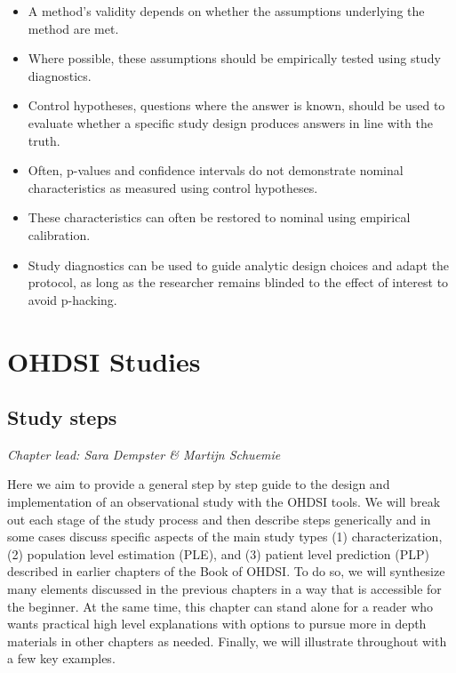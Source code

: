 \documentclass[11pt]{book}
\theoremstyle{definition}
\theoremstyle{definition}
\theoremstyle{definition}
\theoremstyle{remark}
\let\BeginKnitrBlock\begin \let\EndKnitrBlock\end
\begin{document}
\BeginKnitrBlock{rmdsummary}
\begin{itemize}
\item
  A method's validity depends on whether the assumptions underlying the method are met.
\item
  Where possible, these assumptions should be empirically tested using study diagnostics.
\item
  Control hypotheses, questions where the answer is known, should be used to evaluate whether a specific study design produces answers in line with the truth.
\item
  Often, p-values and confidence intervals do not demonstrate nominal characteristics as measured using control hypotheses.
\item
  These characteristics can often be restored to nominal using empirical calibration.
\item
  Study diagnostics can be used to guide analytic design choices and adapt the protocol, as long as the researcher remains blinded to the effect of interest to avoid p-hacking.
\end{itemize}
\EndKnitrBlock{rmdsummary}

\hypertarget{part-ohdsi-studies}{%
\part{OHDSI Studies}\label{part-ohdsi-studies}}

\hypertarget{StudySteps}{%
\chapter{Study steps}\label{StudySteps}}

\emph{Chapter lead: Sara Dempster \& Martijn Schuemie}

Here we aim to provide a general step by step guide to the design and implementation of an observational study with the OHDSI tools. We will break out each stage of the study process and then describe steps generically and in some cases discuss specific aspects of the main study types (1) characterization, (2) population level estimation (PLE), and (3) patient level prediction (PLP) described in earlier chapters of the Book of OHDSI. To do so, we will synthesize many elements discussed in the previous chapters in a way that is accessible for the beginner. At the same time, this chapter can stand alone for a reader who wants practical high level explanations with options to pursue more in depth materials in other chapters as needed. Finally, we will illustrate throughout with a few key examples.
\end{document}
